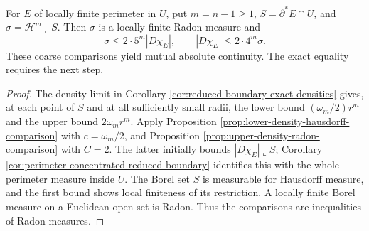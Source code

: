 \begin{corollary}\label{cor:perimeter-hausdorff-equivalence}
For $E$ of locally finite perimeter in $U$, put $m=n-1\geq1$, $S=\partial^*E\cap U$, and $\sigma=\mathcal H^m\llcorner S$. Then $\sigma$ is a locally finite Radon measure and
\[
 \sigma\leq2\cdot5^m|D\chi_E|,
 \qquad |D\chi_E|\leq2\cdot4^m\sigma.
\]
These coarse comparisons yield mutual absolute continuity. The exact equality requires the next step.
\end{corollary}
\begin{proof}
The density limit in Corollary \ref{cor:reduced-boundary-exact-densities} gives, at each point of $S$ and at all sufficiently small radii, the lower bound $(\omega_m/2)r^m$ and the upper bound $2\omega_m r^m$. Apply Proposition \ref{prop:lower-density-hausdorff-comparison} with $c=\omega_m/2$, and Proposition \ref{prop:upper-density-radon-comparison} with $C=2$. The latter initially bounds $|D\chi_E|\llcorner S$; Corollary \ref{cor:perimeter-concentrated-reduced-boundary} identifies this with the whole perimeter measure inside $U$. The Borel set $S$ is measurable for Hausdorff measure, and the first bound shows local finiteness of its restriction. A locally finite Borel measure on a Euclidean open set is Radon. Thus the comparisons are inequalities of Radon measures.
\end{proof}

